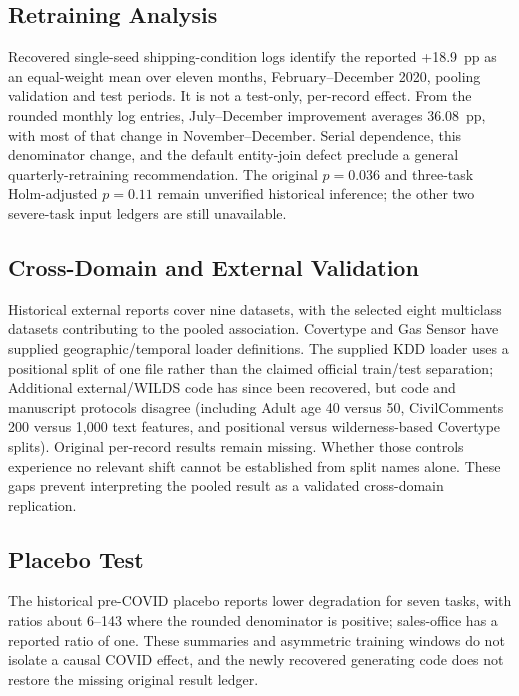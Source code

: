 \documentclass[accepted]{uai2026} %
\begin{document}
\subsection{Retraining Analysis}

Recovered single-seed shipping-condition logs identify the reported +18.9~pp as an equal-weight mean over eleven months, February--December 2020, pooling validation and test periods. It is not a test-only, per-record effect. From the rounded monthly log entries, July--December improvement averages 36.08~pp, with most of that change in November--December. Serial dependence, this denominator change, and the default entity-join defect preclude a general quarterly-retraining recommendation. The original $p=0.036$ and three-task Holm-adjusted $p=0.11$ remain unverified historical inference; the other two severe-task input ledgers are still unavailable.

\subsection{Cross-Domain and External Validation}\label{sec:cross_domain}

Historical external reports cover nine datasets, with the selected eight multiclass datasets contributing to the pooled association. Covertype and Gas Sensor have supplied geographic/temporal loader definitions. The supplied KDD loader uses a positional split of one file rather than the claimed official train/test separation; Additional external/WILDS code has since been recovered, but code and manuscript protocols disagree (including Adult age 40 versus 50, CivilComments 200 versus 1,000 text features, and positional versus wilderness-based Covertype splits). Original per-record results remain missing. Whether those controls experience no relevant shift cannot be established from split names alone. These gaps prevent interpreting the pooled result as a validated cross-domain replication.

\subsection{Placebo Test}

The historical pre-COVID placebo reports lower degradation for seven tasks, with ratios about 6--143 where the rounded denominator is positive; sales-office has a reported ratio of one. These summaries and asymmetric training windows do not isolate a causal COVID effect, and the newly recovered generating code does not restore the missing original result ledger.
\end{document}
